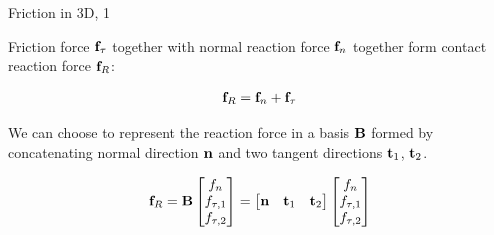 \documentclass{beamer}
\begin{document}
\begin{frame}{Friction in 3D, 1}
	\begin{flushleft}
		
		Friction force $\mathbf{f}_\tau$ together with normal reaction force $\mathbf{f}_n$ together form contact reaction force $\mathbf{f}_R$:
		
		\begin{align}
			\mathbf{f}_R = \mathbf{f}_n + \mathbf{f}_\tau
		\end{align}
		
		We can choose to represent the reaction force in a basis $\mathbf{B}$ formed by concatenating normal direction $\mathbf{n}$ and two tangent directions $\mathbf{t}_1$, $\mathbf{t}_2$.
		
		\begin{align}
			\mathbf{f}_R
			=
			\mathbf{B}
			\begin{bmatrix}
				f_n \\ f_{\tau, 1} \\ f_{\tau, 2}
			\end{bmatrix}
			=
			\begin{bmatrix}
				\mathbf{n} & \mathbf{t}_1 & \mathbf{t}_2
			\end{bmatrix}
			\begin{bmatrix}
				f_n \\ f_{\tau, 1} \\ f_{\tau, 2}
			\end{bmatrix}
		\end{align}
		
		
		
	\end{flushleft}
\end{frame}
\end{document}
